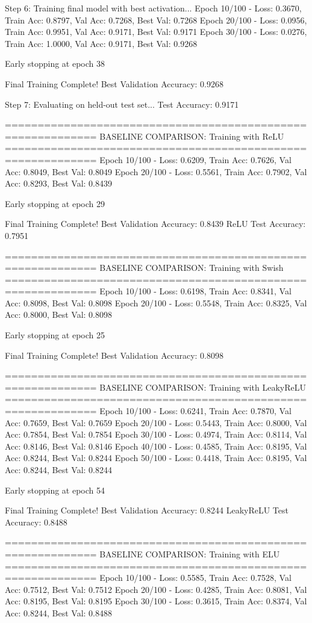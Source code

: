 Step 6: Training final model with best activation...
Epoch  10/100 - Loss: 0.3670, Train Acc: 0.8797, Val Acc: 0.7268, Best Val: 0.7268
Epoch  20/100 - Loss: 0.0956, Train Acc: 0.9951, Val Acc: 0.9171, Best Val: 0.9171
Epoch  30/100 - Loss: 0.0276, Train Acc: 1.0000, Val Acc: 0.9171, Best Val: 0.9268

Early stopping at epoch 38

Final Training Complete!
Best Validation Accuracy: 0.9268

Step 7: Evaluating on held-out test set...
Test Accuracy: 0.9171

============================================================
BASELINE COMPARISON: Training with ReLU
============================================================
Epoch  10/100 - Loss: 0.6209, Train Acc: 0.7626, Val Acc: 0.8049, Best Val: 0.8049
Epoch  20/100 - Loss: 0.5561, Train Acc: 0.7902, Val Acc: 0.8293, Best Val: 0.8439

Early stopping at epoch 29

Final Training Complete!
Best Validation Accuracy: 0.8439
ReLU Test Accuracy: 0.7951

============================================================
BASELINE COMPARISON: Training with Swish
============================================================
Epoch  10/100 - Loss: 0.6198, Train Acc: 0.8341, Val Acc: 0.8098, Best Val: 0.8098
Epoch  20/100 - Loss: 0.5548, Train Acc: 0.8325, Val Acc: 0.8000, Best Val: 0.8098

Early stopping at epoch 25

Final Training Complete!
Best Validation Accuracy: 0.8098

============================================================
BASELINE COMPARISON: Training with LeakyReLU
============================================================
Epoch  10/100 - Loss: 0.6241, Train Acc: 0.7870, Val Acc: 0.7659, Best Val: 0.7659
Epoch  20/100 - Loss: 0.5443, Train Acc: 0.8000, Val Acc: 0.7854, Best Val: 0.7854
Epoch  30/100 - Loss: 0.4974, Train Acc: 0.8114, Val Acc: 0.8146, Best Val: 0.8146
Epoch  40/100 - Loss: 0.4585, Train Acc: 0.8195, Val Acc: 0.8244, Best Val: 0.8244
Epoch  50/100 - Loss: 0.4418, Train Acc: 0.8195, Val Acc: 0.8244, Best Val: 0.8244

Early stopping at epoch 54

Final Training Complete!
Best Validation Accuracy: 0.8244
LeakyReLU Test Accuracy: 0.8488

============================================================
BASELINE COMPARISON: Training with ELU
============================================================
Epoch  10/100 - Loss: 0.5585, Train Acc: 0.7528, Val Acc: 0.7512, Best Val: 0.7512
Epoch  20/100 - Loss: 0.4285, Train Acc: 0.8081, Val Acc: 0.8195, Best Val: 0.8195
Epoch  30/100 - Loss: 0.3615, Train Acc: 0.8374, Val Acc: 0.8244, Best Val: 0.8488

